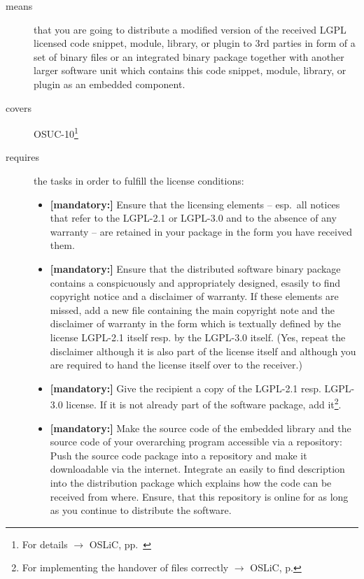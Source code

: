 \begin{description}
\item[means] that you are going to distribute a modified version of the received
LGPL licensed code snippet, module, library, or plugin to 3rd parties in form
of a set of binary files or an integrated binary package together with another
larger software unit which contains this code snippet, module, library, or
plugin as an embedded component.
\item[covers] OSUC-10\footnote{For details $\rightarrow$ OSLiC, pp.\ \pageref{OSUC-10-DEF}}
\item[requires] the tasks in order to fulfill the license conditions:
\begin{itemize}
  

  \item \textbf{[mandatory:]} Ensure that the licensing elements -- esp.\ all
  notices that refer to the LGPL-2.1 or LGPL-3.0 and to the absence of any
  warranty -- are retained in your package in the form you have received them.

  \item \textbf{[mandatory:]} Ensure that the distributed software binary
  package contains a conspicuously and appropriately designed, esasily to find
  copyright notice and a disclaimer of warranty. If these elements are missed,
  add a new file containing the main copyright note and the disclaimer of
  warranty in the form which is textually defined by the license LGPL-2.1 itself
  resp. by the LGPL-3.0 itself. (Yes, repeat the disclaimer although it is also
  part of the license itself and although you are required to hand the license
  itself over to the receiver.)
  
  \item \textbf{[mandatory:]} Give the recipient a copy of the LGPL-2.1 resp.
  LGPL-3.0 license. If it is not already part of the software package, add
  it\footnote{For implementing the handover of files correctly $\rightarrow$
  OSLiC, p. \pageref{DistributingFilesHint}}.

  \item \textbf{[mandatory:]} Make the source code of the embedded library and
  the source code of your overarching program accessible via a repository: Push
  the source code package into a repository and make it downloadable via the
  internet. Integrate an easily to find description into the distribution
  package which explains how the code can be received from where. Ensure, that
  this repository is online for as long as you continue to distribute the
  software.


\end{itemize}
\end{description}
